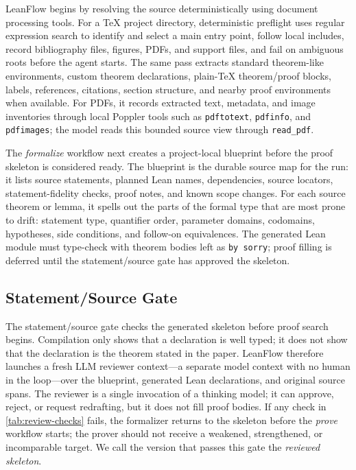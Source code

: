 \documentclass{article}
\newcommand{\method}{LeanFlow\xspace}
\newcommand{\lean}{Lean\xspace}
\begin{document}
\method begins by resolving the source deterministically using document processing tools.
For a \TeX{} project directory, deterministic preflight uses regular expression search to identify and select a main entry point, follow local includes, record bibliography files, figures, PDFs, and support files, and fail on ambiguous roots before the agent starts.
The same pass extracts standard theorem-like environments, custom theorem declarations, plain-\TeX{} theorem/proof blocks, labels, references, citations, section structure, and nearby proof environments when available.
For PDFs, it records extracted text, metadata, and image inventories through local Poppler tools such as \texttt{pdftotext}, \texttt{pdfinfo}, and \texttt{pdfimages}; the model reads this bounded source view through \texttt{read\_pdf}.

The \emph{formalize} workflow next creates a project-local blueprint before the proof skeleton is considered ready.
The blueprint is the durable source map for the run: it lists source statements, planned \lean names, dependencies, source locators, statement-fidelity checks, proof notes, and known scope changes.
For each source theorem or lemma, it spells out the parts of the formal type that are most prone to drift: statement type, quantifier order, parameter domains, codomains, hypotheses, side conditions, and follow-on equivalences.
The generated \lean module must type-check with theorem bodies left as \texttt{by sorry}; proof filling is deferred until the statement/source gate has approved the skeleton.

\subsection{Statement/Source Gate}

The statement/source gate checks the generated skeleton before proof search begins.
Compilation only shows that a declaration is well typed; it does not show that the declaration is the theorem stated in the paper.
\method therefore launches a fresh LLM reviewer context---a separate model context with no human in the loop---over the blueprint, generated \lean declarations, and original source spans.
The reviewer is a single invocation of a thinking model; it can approve, reject, or request redrafting, but it does not fill proof bodies.
If any check in \cref{tab:review-checks} fails, the formalizer returns to the skeleton before the \emph{prove} workflow starts; the prover should not receive a weakened, strengthened, or incomparable target.
We call the version that passes this gate the \emph{reviewed skeleton}.
\end{document}
